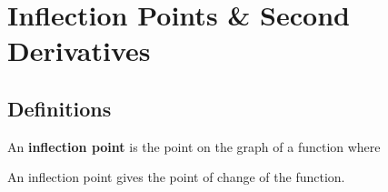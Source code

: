 \documentclass[notes]{subfiles}
\begin{document}
	\fancyhead[LO,RE]{\bfseries  \currentname}
	\fancyfoot[C]{{}}
	\fancyfoot[RO,LE]{\large \thepage}	%

\section*{Inflection Points \& Second Derivatives}\label{cs44}
	\subsection*{Definitions}
		\begin{defn} 
			An \textbf{inflection point} is the point on the graph of a function where 
		\end{defn}
			
		An inflection point gives the point of  change of the function.
			
\end{document}
